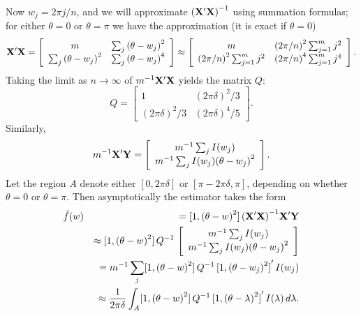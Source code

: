 \documentclass[12p E.Lt,psfig]{article} %
\def\tends{\rightarrow}
\begin{document}
 Now $w_j  =  2 \pi j/n$, and we will approximate $ {( {\bf X}^{\prime} {\bf X} )}^{-1}$
  using summation formulas;  for either $\theta = 0$ or $\theta = \pi$ we have
   the approximation (it is exact if $\theta = 0$)
\[
   {\bf X}^{\prime} {\bf X}  =  \left[ \begin{array}{cc}
  	m &  \sum_j  {(\theta - w_j) }^2 \\
  	 \sum_j  { (\theta - w_j) }^2 &  \sum_j  { (\theta - w_j) }^4  \end{array} \right]
  \approx   \left[ \begin{array}{cc}
  	m &  {(2 \pi/n)}^2  \sum_{j=1}^m  j^2 \\
  	 {(2 \pi/n)}^2  \sum_{j=1}^m  j^2  &   {(2 \pi/n)}^4  \sum_{j=1}^m  j^4   \end{array} \right].
\]
 Taking the limit as $n \tends \infty$ of $m^{-1} {\bf X}^{\prime} {\bf X}$ yields the matrix $Q$:
 \[
   Q =  \left[ \begin{array}{cc} 1 & {(  2 \pi\delta ) }^2  /3 \\
        {(  2 \pi\delta ) }^2  /3  &   {(  2 \pi \delta ) }^4  /5 \end{array} \right].
  \]
   Similarly,
\[
    m^{-1} {\bf X}^{\prime} {\bf Y} =
    \left[ \begin{array}{c}  m^{-1} \sum_j  I (w_j)  \\  m^{-1} \sum_j  I(w_j)  {(\theta -w_j)}^2 \end{array} \right].
\]
Let the region $A$ denote either $[0, 2 \pi \delta]$ or $[\pi - 2 \pi \delta, \pi]$, depending on whether $\theta = 0$
 or $\theta =   \pi$.   Then asymptotically the estimator takes the form
  \begin{eqnarray*}
&   \tilde f (w) & =  [ 1,  {( \theta  - w)}^2 ] \,   {( {\bf X}^{\prime} {\bf X} )}^{-1} {\bf X}^{\prime} {\bf Y}  \\
 &  & \approx   [ 1,  {( \theta  - w)}^2 ] \, Q^{-1}  \,  \left[ \begin{array}{c}  m^{-1} \sum_j  I (w_j)  \\
     m^{-1} \sum_j  I(w_j)  {( \theta  -w_j)}^2 \end{array} \right]  \\
 &  &=  m^{-1} \sum_j    [ 1,  {( \theta  - w)}^2 ] \, Q^{-1}  \,  { [ 1, {( \theta  -w_j)}^2  ]}^{\prime} \, I(w_j)  \\
  &    & \approx   \frac{1}{ 2 \pi  \delta} \int_{A}
       [ 1,  {( \theta  - w)}^2 ] \, Q^{-1}  \,  { [ 1,  {( \theta    - \lambda )}^2  ]}^{\prime} \, I(\lambda) \, d\lambda.
\end{eqnarray*}
\end{document}
